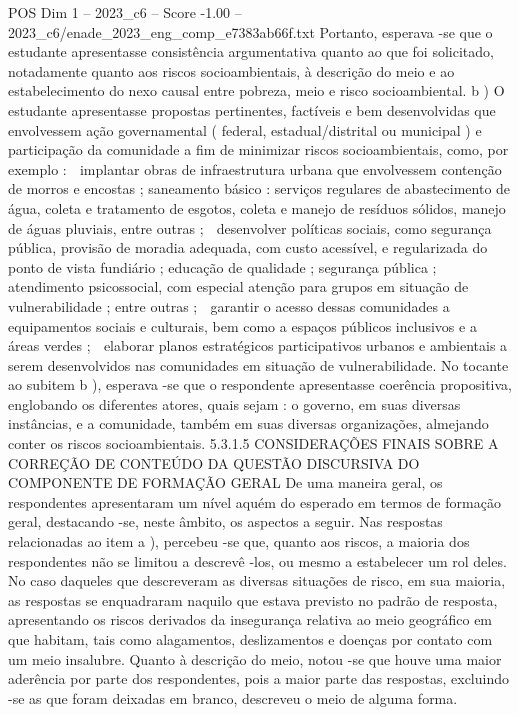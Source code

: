 \begin{textsample}{POS Dim 1 – 2023\_c6 – Score -1.00 – 2023\_c6/enade\_2023\_eng\_comp\_e7383ab66f.txt}
Portanto, esperava -se que o estudante apresentasse consistência argumentativa quanto ao que foi solicitado, notadamente quanto aos riscos socioambientais, à descrição do meio e ao estabelecimento do nexo causal entre pobreza, meio e risco socioambiental. b ) O estudante apresentasse propostas pertinentes, factíveis e bem desenvolvidas que envolvessem ação governamental ( federal, estadual/distrital ou municipal ) e participação da comunidade a fim de minimizar riscos socioambientais, como, por exemplo :  implantar obras de infraestrutura urbana que envolvessem contenção de morros e encostas ; saneamento básico : serviços regulares de abastecimento de água, coleta e tratamento de esgotos, coleta e manejo de resíduos sólidos, manejo de águas pluviais, entre outras ;  desenvolver políticas sociais, como segurança pública, provisão de moradia adequada, com custo acessível, e regularizada do ponto de vista fundiário ; educação de qualidade ; segurança pública ; atendimento psicossocial, com especial atenção para grupos em situação de vulnerabilidade ; entre outras ;  garantir o acesso dessas comunidades a equipamentos sociais e culturais, bem como a espaços públicos inclusivos e a áreas verdes ;  elaborar planos estratégicos participativos urbanos e ambientais a serem desenvolvidos nas comunidades em situação de vulnerabilidade.
No tocante ao subitem b ), esperava -se que o respondente apresentasse coerência propositiva, englobando os diferentes atores, quais sejam : o governo, em suas diversas instâncias, e a comunidade, também em suas diversas organizações, almejando conter os riscos socioambientais. 5.3.1.5 CONSIDERAÇÕES FINAIS SOBRE A CORREÇÃO DE CONTEÚDO DA QUESTÃO DISCURSIVA DO COMPONENTE DE FORMAÇÃO GERAL De uma maneira geral, os respondentes apresentaram um nível aquém do esperado em termos de formação geral, destacando -se, neste âmbito, os aspectos a seguir.
Nas respostas relacionadas ao item a ), percebeu -se que, quanto aos riscos, a maioria dos respondentes não se limitou a descrevê -los, ou mesmo a estabelecer um rol deles.
No caso daqueles que descreveram as diversas situações de risco, em sua maioria, as respostas se enquadraram naquilo que estava previsto no padrão de resposta, apresentando os riscos derivados da insegurança relativa ao meio geográfico em que habitam, tais como alagamentos, deslizamentos e doenças por contato com um meio insalubre.
Quanto à descrição do meio, notou -se que houve uma maior aderência por parte dos respondentes, pois a maior parte das respostas, excluindo -se as que foram deixadas em branco, descreveu o meio de alguma forma.

\end{textsample}

